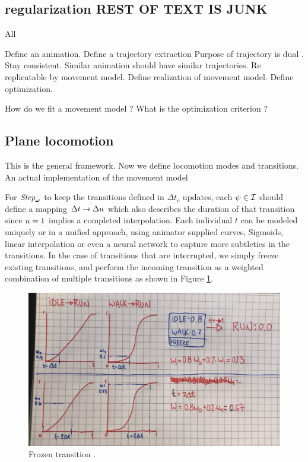 \subsection{regularization REST OF TEXT IS JUNK}


All 

Define an animation.
Define a trajectory extraction
Purpose of trajectory is dual . Stay consistent. Similar animation should have similar trajectories. Re replicatable by movement model. 
Define realization of movement model. 
Define optimization.


How do we fit a movement model ? What is the optimization criterion ?

\subsection{Plane locomotion}

This is the general framework. Now we define locomotion modes and transitions. An actual implementation of the movement model

For $\textit{Step}_{\boldsymbol{\omega }}$ to keep the transitions defined in $\Delta{t}_c$ updates, each $\psi\in\mathcal{I}$ should define a mapping $\Delta{t} \rightarrow \Delta u$ which also describes the duration of that transition since $u=1$ implies a completed interpolation. Each individual $t$ can be modeled uniquely or in a unified approach, using animator supplied curves, Sigmoids, linear interpolation or even a neural network to capture more subtleties in the transitions. In the case of transitions that are interrupted, we simply freeze existing transitions, and perform the incoming transition as a weighted combination of multiple transitions as shown in Figure \ref{fig:frozen-transition}. 
\begin{figure}
    \centering
    \includegraphics[width=0.75\columnwidth]{img/frozen-transitions}
    \caption{Frozen transition .}
  \label{fig:frozen-transition}
\end{figure}

